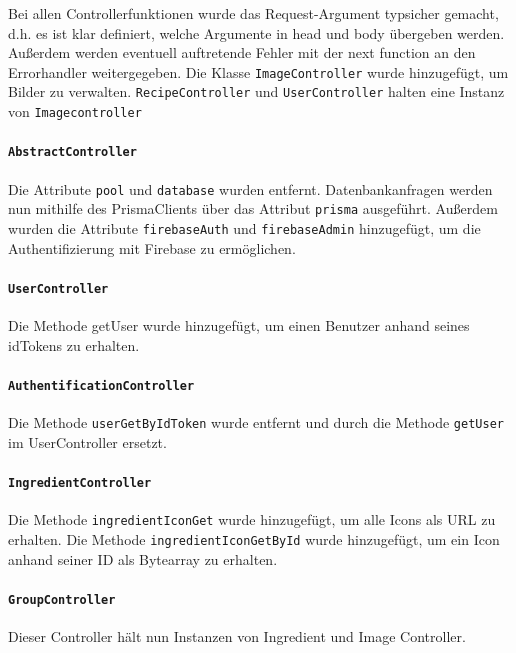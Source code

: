 \documentclass{implementierungsheft}
\begin{document}
Bei allen Controllerfunktionen wurde das Request-Argument typsicher gemacht, d.h. es ist klar definiert, welche Argumente in head und body übergeben werden.
Außerdem werden eventuell auftretende Fehler mit der next function an den Errorhandler weitergegeben. Die Klasse \texttt{ImageController} wurde hinzugefügt, um Bilder zu verwalten.
\texttt{RecipeController} und \texttt{UserController} halten eine Instanz von \texttt{Imagecontroller}

\paragraph{\texttt{AbstractController}} Die Attribute \texttt{pool} und \texttt{database} wurden entfernt. Datenbankanfragen werden nun mithilfe des PrismaClients über das Attribut \texttt{prisma} ausgeführt.
Außerdem wurden die Attribute \texttt{firebaseAuth} und \texttt{firebaseAdmin} hinzugefügt, um die Authentifizierung mit Firebase zu ermöglichen.

\paragraph{\texttt{UserController}} Die Methode getUser wurde hinzugefügt, um einen Benutzer anhand seines idTokens zu erhalten.

\paragraph{\texttt{AuthentificationController}} Die Methode \texttt{userGetByIdToken} wurde entfernt und durch die Methode \texttt{getUser} im UserController ersetzt.

\paragraph{\texttt{IngredientController}} Die Methode \texttt{ingredientIconGet} wurde hinzugefügt, um alle Icons als URL zu erhalten. Die Methode \texttt{ingredientIconGetById} wurde hinzugefügt, um ein Icon anhand seiner ID als Bytearray zu erhalten.

\paragraph{\texttt{GroupController}} Dieser Controller hält nun Instanzen von Ingredient und Image Controller.
\end{document}
